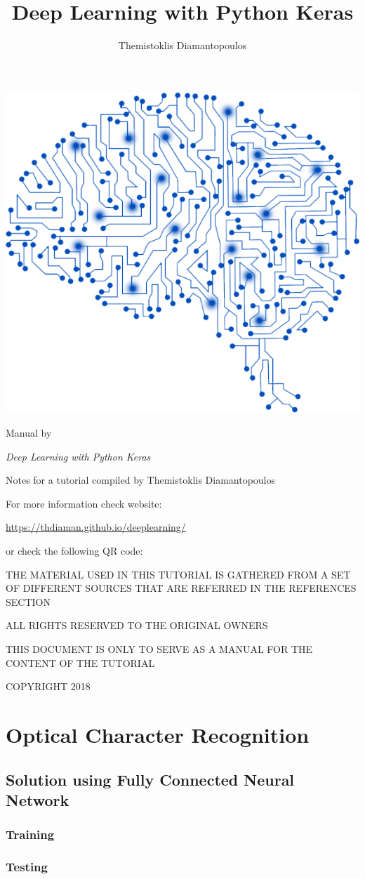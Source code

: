 \documentclass[10pt,twoside,a4paper,openany]{memoir}
\author{Themistoklis Diamantopoulos}
\title{Deep Learning with Python Keras}
\date{}
\makeatletter
\def\maketitle{%
  \null
  \thispagestyle{empty}%
  \vfill

  \begin{center}
    \normalfont
    \centering

    \begin{minipage}{\linewidth}
    \centering
    \includegraphics[scale=0.3]{images/box-icon.png}
    \end{minipage}

    \vskip 1cm
    
    {\huge\@title\par}%
    \hrulefill\par
    \vskip 1cm

    {\LARGE\raggedleft Manual by \@author\par}%
  \end{center}%
  \vfill
  \null
  \clearpage
  }
\makeatother
\begin{document}
\maketitle

\frontmatter

\null
\thispagestyle{empty}%
\vfill

\begin{flushleft}
\textit{Deep Learning with Python Keras}

Notes for a tutorial compiled by Themistoklis Diamantopoulos

\vskip 0.2cm

For more information check website:

\url{https://thdiaman.github.io/deeplearning/}

or check the following QR code:

\vskip 0.2cm


\bigskip

THE MATERIAL USED IN THIS TUTORIAL IS GATHERED FROM A SET OF DIFFERENT SOURCES THAT ARE REFERRED IN THE REFERENCES SECTION

\vskip 0.2cm
ALL RIGHTS RESERVED TO THE ORIGINAL OWNERS

\vskip 0.2cm
THIS DOCUMENT IS ONLY TO SERVE AS A MANUAL FOR THE CONTENT OF THE TUTORIAL

\vskip 0.2cm
COPYRIGHT 2018

\end{flushleft}



\mainmatter

\chapter{Optical Character Recognition}

\section{Solution using Fully Connected Neural Network}
\subsection{Training}


\subsection{Testing}

\end{document}
